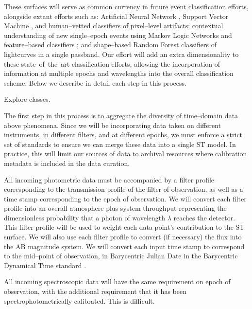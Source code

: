 These surfaces will serve as common currency in future event classification
efforts, alongside extant efforts such as: Artificial Neural Network
\citep{2008AN....329..263D}, Support Vector Machine \citep{2007ApJ...665.1246B},
and human--vetted \citep{2011arXiv1106.5491B} classifiers of pixel--level
artifacts; contextual understanding of new single--epoch events using Markov
Logic Networks \citep{2011arXiv1110.4655D} and feature--based classifiers
\citep{2011arXiv1106.5491B}; and shape--based Random Forest
\citep{2011ApJ...733...10R} classifiers of lightcurves in a single passband. Our
effort will add an extra dimensionality to these state--of--the--art
classification efforts, allowing the incorporation of information at multiple
epochs and wavelengths into the overall classification scheme.  Below we
describe in detail each step in this process.


 \smallskip

Explore classes.

The first step in this process is to aggregate the diversity of time--domain
data above phenomena.  Since we will be incorporating data taken on different
instruments, in different filters, and at different epochs, we must enforce a
strict set of standards to ensure we can merge these data into a single ST
model. In practice, this will limit our sources of data to archival resources
where calibration metadata is included in the data curation.

All incoming photometric data must be accompanied by a filter profile
corresponding to the transmission profile of the filter of observation, as well
as a time stamp corresponding to the epoch of observation.  We will convert each
filter profile into an overall atmosphere plus system throughput representing
the dimensionless probability that a photon of wavelength $\lambda$ reaches the
detector.  This filter profile will be used to weight each data point's
contribution to the ST surface.  We will also use each filter profile to convert
(if necessary) the flux into the AB magnitude system.  We will convert each
input time stamp to correspond to the mid--point of observation, in Barycentric
Julian Date in the Barycentric Dynamical Time standard
\citep{2010PASP..122..935E}.

All incoming spectroscopic data will have the same requirement on epoch of
observation, with the additional requirement that it has been
spectrophotometrically calibrated.  This is difficult.

